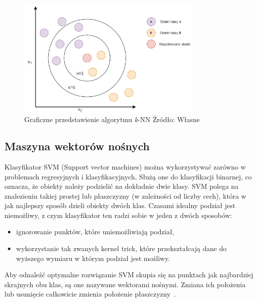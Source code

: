 \begin{figure}[H]
    \centering
    \includegraphics[width=0.8\textwidth]{./Img/KNN.png}
    \caption{Graficzne przedstawienie algorytmu \textit{k}-NN Źródło: Własne}
\end{figure}

\subsection{Maszyna wektorów nośnych}

Klasyfikator SVM (Support vector machines) można wykorzystywać zarówno 
w problemach regresyjnych i klasyfikacyjnych. Służą one do klasyfikacji binarnej, co 
oznacza, że obiekty należy podzielić na dokładnie dwie klasy. SVM polega na znalezieniu
takiej prostej lub płaszczyzny (w zależności od liczby cech), która w jak najlepszy sposób
dzieli obiekty dwóch klas. Czasami idealny podział jest niemożliwy, z czym klasyfikator 
ten radzi sobie w jeden z dwóch sposobów:
\begin{itemize}
    \item ignorowanie punktów, które uniemożliwiają podział,
    \item wykorzystanie tak zwanych kernel trick, które przekształcają dane do wyższego 
    wymiaru w którym podział jest możliwy.
\end{itemize}
Aby odnaleźć optymalne rozwiązanie SVM skupia się na punktach jak najbardziej skrajnych
obu klas, są one nazywane wektorami nośnymi. Zmiana ich położenia lub usunięcie
całkowicie zmienia położenie płaszczyzny~\cite{MLAlgorithms}.

